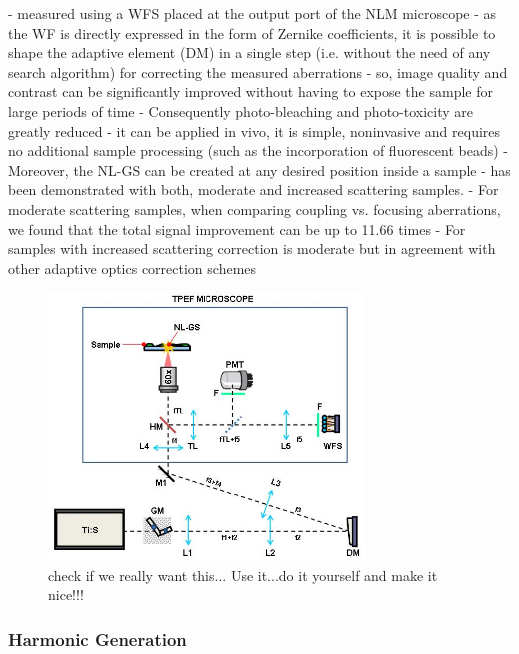 - measured using a WFS placed at the output port of the NLM microscope
- as the WF is directly expressed in the form of Zernike coefficients, it is possible to shape the adaptive element (DM) in a single step (i.e. without the need of any search algorithm) for correcting the measured aberrations
- so, image quality and contrast can be significantly improved without having to expose the sample for large periods of time
- Consequently photo-bleaching and photo-toxicity are greatly reduced
- it can be applied in vivo, it is simple, noninvasive and requires no additional sample processing (such as the incorporation of fluorescent beads)
- Moreover, the NL-GS can be created at any desired position inside a sample
- has been demonstrated with both, moderate and increased scattering samples.
- For moderate scattering samples, when comparing coupling vs. focusing aberrations, we found that the total signal improvement can be up to 11.66 times 
- For samples with increased scattering correction is moderate but in agreement with other adaptive optics correction schemes

\begin{figure}
	\centering
		\includegraphics[width=0.75\textwidth]{images/TPFM_guide-star.jpg}
	\caption{check if we really want this...\cite{scan_TPFM_guide_start} Use it...do it yourself and make it nice!!!}
	\label{fig:TPFM_guide-star}
\end{figure}

\cite{scan_TPFM_guide_start}

\subsubsection{Harmonic Generation}
\label{sec:HarmonicGeneration}

